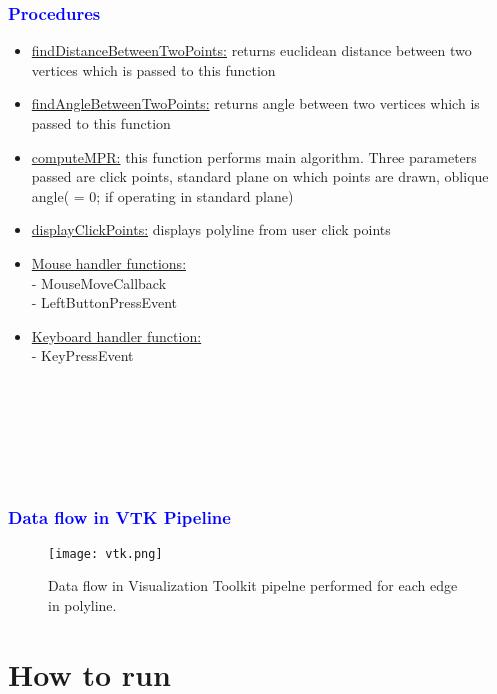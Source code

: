 \documentclass[12pt]{report}
\begin{document}
\subsection{\textcolor{blue}{Procedures} }
\begin{itemize}
\item
\underline{findDistanceBetweenTwoPoints:} returns euclidean distance between two vertices which is passed to this function \\
\item
\underline{findAngleBetweenTwoPoints:} returns angle between two vertices which is passed to this function \\
\item
\underline{computeMPR:} this function performs main algorithm. Three parameters passed are click points, standard plane on which points are drawn, oblique angle( = 0; if operating in standard plane) \\
\item
\underline{displayClickPoints:} displays polyline from user click points \\
\item
\underline{Mouse handler functions:} \\
- MouseMoveCallback \\
- LeftButtonPressEvent \\
\item
\underline{Keyboard handler function:} \\
- KeyPressEvent \\
\\
\\
\\
\\
\\
\\
\end{itemize}


\subsection{\textcolor{blue}{Data flow in VTK Pipeline} }

\begin{figure}[h]
\centering
\texttt{[image: vtk.png]}
\caption{Data flow in Visualization Toolkit pipelne performed for each edge in polyline. }
\end{figure}


\chapter{How to run}
\end{document}
